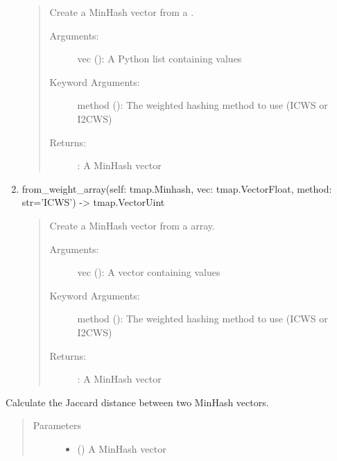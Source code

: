 \documentclass[letterpaper,10pt,english]{sphinxmanual}
\begin{document}
\begin{fulllineitems}
\begin{fulllineitems}
\begin{enumerate}
\begin{quote}
Create a MinHash vector from a .
\begin{description}
\item[{Arguments:}] \leavevmode
vec (): A Python list containing  values

\item[{Keyword Arguments:}] \leavevmode
method (): The weighted hashing method to use (ICWS or I2CWS)

\item[{Returns:}] \leavevmode
{}: A MinHash vector

\end{description}
\end{quote}

\item {} 
from\_weight\_array(self: tmap.Minhash, vec: tmap.VectorFloat, method: str=’ICWS’) -\textgreater{} tmap.VectorUint
\begin{quote}

Create a MinHash vector from a  array.
\begin{description}
\item[{Arguments:}] \leavevmode
vec (): A vector containing  values

\item[{Keyword Arguments:}] \leavevmode
method (): The weighted hashing method to use (ICWS or I2CWS)

\item[{Returns:}] \leavevmode
{}: A MinHash vector

\end{description}
\end{quote}

\end{enumerate}

\end{fulllineitems}


\begin{fulllineitems}
\label{\detokenize{documentation:tmap.Minhash.get_distance}}
Calculate the Jaccard distance between two MinHash vectors.
\begin{quote}\begin{description}
\item[{Parameters}] \leavevmode\begin{itemize}
\item {} 
 () \textendash{} A MinHash vector


\end{itemize}
\end{description}
\end{quote}
\end{fulllineitems}
\end{fulllineitems}
\end{document}
